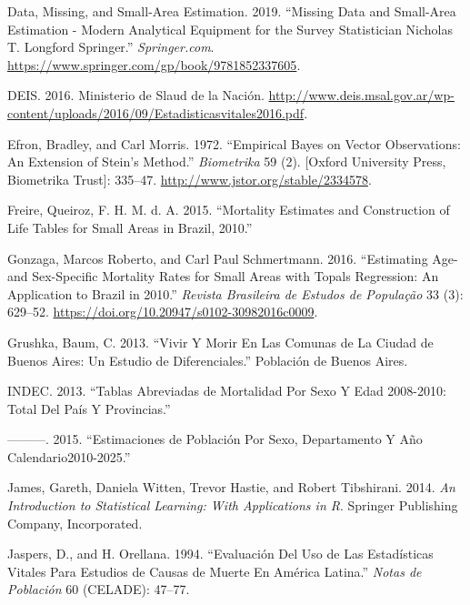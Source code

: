 \documentclass[12pt,]{article}
\begin{document}
\leavevmode\hypertarget{ref-Longford2005}{}%
Data, Missing, and Small-Area Estimation. 2019. ``Missing Data and
Small-Area Estimation - Modern Analytical Equipment for the Survey
Statistician \textbar{} Nicholas T. Longford \textbar{} Springer.''
\emph{Springer.com}.
\url{https://www.springer.com/gp/book/9781852337605}.

\leavevmode\hypertarget{ref-DEIS2016}{}%
DEIS. 2016. Ministerio de Slaud de la Nación.
\url{http://www.deis.msal.gov.ar/wp-content/uploads/2016/09/Estadisticasvitales2016.pdf}.

\leavevmode\hypertarget{ref-Efron1972}{}%
Efron, Bradley, and Carl Morris. 1972. ``Empirical Bayes on Vector
Observations: An Extension of Stein's Method.'' \emph{Biometrika} 59
(2). {[}Oxford University Press, Biometrika Trust{]}: 335--47.
\url{http://www.jstor.org/stable/2334578}.

\leavevmode\hypertarget{ref-FreireEtAl2015}{}%
Freire, Queiroz, F. H. M. d. A. 2015. ``Mortality Estimates and
Construction of Life Tables for Small Areas in Brazil, 2010.''

\leavevmode\hypertarget{ref-Gonzaga_Schmertmann_2016}{}%
Gonzaga, Marcos Roberto, and Carl Paul Schmertmann. 2016. ``Estimating
Age- and Sex-Specific Mortality Rates for Small Areas with Topals
Regression: An Application to Brazil in 2010.'' \emph{Revista Brasileira
de Estudos de População} 33 (3): 629--52.
\url{https://doi.org/10.20947/s0102-30982016c0009}.

\leavevmode\hypertarget{ref-Grushka2013}{}%
Grushka, Baum, C. 2013. ``Vivir Y Morir En Las Comunas de La Ciudad de
Buenos Aires: Un Estudio de Diferenciales.'' Población de Buenos Aires.

\leavevmode\hypertarget{ref-INDEC2013}{}%
INDEC. 2013. ``Tablas Abreviadas de Mortalidad Por Sexo Y Edad
2008-2010: Total Del País Y Provincias.''

\leavevmode\hypertarget{ref-INDEC2015}{}%
---------. 2015. ``Estimaciones de Población Por Sexo, Departamento Y
Año Calendario2010-2025.''

\leavevmode\hypertarget{ref-James2014}{}%
James, Gareth, Daniela Witten, Trevor Hastie, and Robert Tibshirani.
2014. \emph{An Introduction to Statistical Learning: With Applications
in R}. Springer Publishing Company, Incorporated.

\leavevmode\hypertarget{ref-JaspersOrellana1994}{}%
Jaspers, D., and H. Orellana. 1994. ``Evaluación Del Uso de Las
Estadísticas Vitales Para Estudios de Causas de Muerte En América
Latina.'' \emph{Notas de Población} 60 (CELADE): 47--77.
\end{document}
